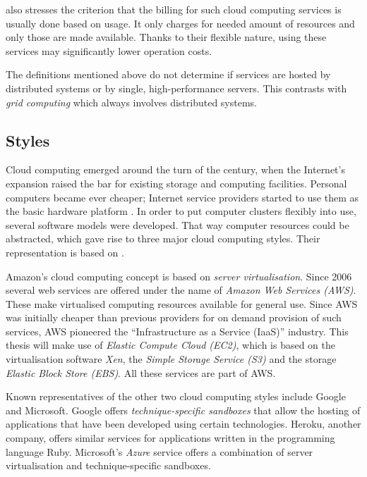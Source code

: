  also stresses the criterion that the billing for such cloud computing services is usually done based on usage. It only charges for needed amount of resources and only those are made available. Thanks to their flexible nature, using these services may significantly lower operation costs.

The definitions mentioned above do not determine if services are hosted by distributed systems or by single, high-performance servers. This contrasts with \textit{grid computing} which always involves distributed systems.


\subsection{Styles}

Cloud computing emerged around the turn of the century, when the Internet's expansion raised the bar for existing storage and computing facilities. Personal computers became ever cheaper; Internet service providers started to use them as the basic hardware platform . In order to put computer clusters flexibly into use, several software models were developed. That way computer resources could be abstracted, which gave rise to three major cloud computing styles. Their representation is based on .

Amazon's cloud computing concept is based on \textit{server virtualisation}. Since 2006 several web services are offered under the name of \textit{Amazon Web Services (AWS)}. These make virtualised computing resources available for general use. Since AWS was initially cheaper than previous providers for on demand provision of such services, AWS pioneered the \enquote{Infrastructure as a Service (IaaS)} industry. This thesis will make use of \textit{Elastic Compute Cloud (EC2)}, which is based on the virtualisation software \textit{Xen}, the \textit{Simple Storage Service (S3)} and the storage \textit{Elastic Block Store (EBS)}. All these services are part of AWS.

Known representatives of the other two cloud computing styles include Google and Microsoft. Google offers \textit{technique-specific sandboxes} that allow the hosting of applications that have been developed using certain technologies. Heroku, another company, offers similar services for applications written in the programming language Ruby. Microsoft's \textit{Azure} service offers a combination of server virtualisation and technique-specific sandboxes.

